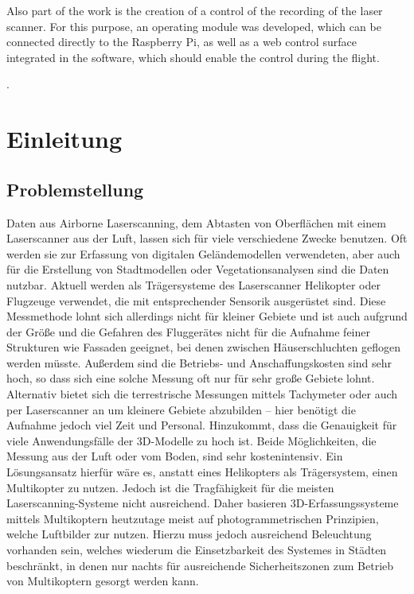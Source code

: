 \documentclass[a4paper,12pt,bibliography=totoc, listof=totoc,titlepage,pointlessnumbers]{scrreprt}
\begin{document}
Also part of the work is the creation of a control of the recording of the laser scanner. For this purpose, an operating module was developed, which can be connected directly to the Raspberry Pi, as well as a web control surface integrated in the software, which should enable the control during the flight.


\providecommand{\citeTwo}[4]{\citep[{\citealp[#1]{#2};}][#3]{#4}} 
\providecommand{\citeThree}[6]{\citep[{\citealp[#1]{#2}; \citealp[#3]{#4};}][#5]{#6}} 
\providecommand{\citeFour}[8]{\citep[{\citealp[#1]{#2}; \citealp[#3]{#4}; \citealp[#5]{#6};}][#7]{#8}}.

\newpage

\tableofcontents
\newpage

\setcounter{page}{1} 

\chapter{Einleitung}

\section{Problemstellung}
Daten aus Airborne Laserscanning, dem Abtasten von Oberflächen mit einem Laserscanner aus der Luft, lassen sich für viele verschiedene Zwecke benutzen. Oft werden sie zur Erfassung von digitalen Geländemodellen verwendeten, aber auch für die Erstellung von Stadtmodellen oder Vegetationsanalysen sind die Daten nutzbar. Aktuell werden als Trägersysteme des Laserscanner Helikopter oder Flugzeuge verwendet, die mit entsprechender Sensorik ausgerüstet sind. Diese Messmethode lohnt sich allerdings nicht für kleiner Gebiete und ist auch aufgrund der Größe und die Gefahren des Fluggerätes nicht für die Aufnahme feiner Strukturen wie Fassaden geeignet, bei denen zwischen Häuserschluchten geflogen werden müsste. Außerdem sind die Betriebs- und Anschaffungskosten sind sehr hoch, so dass sich eine solche Messung oft nur für sehr große Gebiete lohnt. Alternativ bietet sich die terrestrische Messungen mittels Tachymeter oder auch per Laserscanner an um kleinere Gebiete abzubilden -- hier benötigt die Aufnahme jedoch viel Zeit und Personal. Hinzukommt, dass die Genauigkeit für viele Anwendungsfälle der 3D-Modelle zu hoch ist. Beide Möglichkeiten, die Messung aus der Luft oder vom Boden, sind sehr kostenintensiv. Ein Lösungsansatz hierfür wäre es, anstatt eines Helikopters als Trägersystem, einen Multikopter zu nutzen. Jedoch ist die Tragfähigkeit für die meisten Laserscanning-Systeme nicht ausreichend. Daher basieren 3D-Erfassungssysteme mittels Multikoptern heutzutage meist auf photogrammetrischen Prinzipien, welche Luftbilder zur nutzen. Hierzu muss jedoch ausreichend Beleuchtung vorhanden sein, welches wiederum die Einsetzbarkeit des Systemes in Städten beschränkt, in denen nur nachts für ausreichende Sicherheitszonen zum Betrieb von Multikoptern gesorgt werden kann. 
\end{document}
